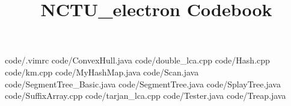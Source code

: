 \documentclass {article}
\begin{document}
\title {NCTU_electron Codebook}
 {code/.vimrc}
 {code/ConvexHull.java}
 {code/double_lca.cpp}
 {code/Hash.cpp}
 {code/km.cpp}
 {code/MyHashMap.java}
 {code/Scan.java}
 {code/SegmentTree_Basic.java}
 {code/SegmentTree.java}
 {code/SplayTree.java}
 {code/SuffixArray.cpp}
 {code/tarjan_lca.cpp}
 {code/Tester.java}
 {code/Treap.java}
\end{document}
